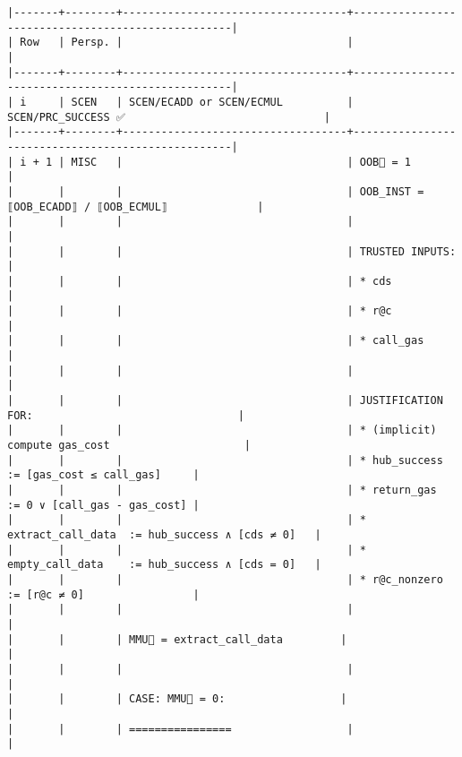 \documentclass[varwidth=\maxdimen,margin=0.5cm,multi={verbatim}]{standalone}
\begin{document}
\begin{verbatim}
|-------+--------+-----------------------------------+---------------------------------------------------|
| Row   | Persp. |                                   |                                                   |
|-------+--------+-----------------------------------+---------------------------------------------------|
| i     | SCEN   | SCEN/ECADD or SCEN/ECMUL          | SCEN/PRC_SUCCESS ✅                               |
|-------+--------+-----------------------------------+---------------------------------------------------|
| i + 1 | MISC   |                                   | OOB🏴 = 1                                         |
|       |        |                                   | OOB_INST = ⟦OOB_ECADD⟧ / ⟦OOB_ECMUL⟧              |
|       |        |                                   |                                                   |
|       |        |                                   | TRUSTED INPUTS:                                   |
|       |        |                                   | * cds                                             |
|       |        |                                   | * r@c                                             |
|       |        |                                   | * call_gas                                        |
|       |        |                                   |                                                   |
|       |        |                                   | JUSTIFICATION FOR:                                |
|       |        |                                   | * (implicit) compute gas_cost                     |
|       |        |                                   | * hub_success        := [gas_cost ≤ call_gas]     |
|       |        |                                   | * return_gas         := 0 ∨ [call_gas - gas_cost] |
|       |        |                                   | * extract_call_data  := hub_success ∧ [cds ≠ 0]   |
|       |        |                                   | * empty_call_data    := hub_success ∧ [cds = 0]   |
|       |        |                                   | * r@c_nonzero        := [r@c ≠ 0]                 |
|       |        |                                   |                                                   |
|       |        | MMU🏴 = extract_call_data         |                                                   |
|       |        |                                   |                                                   |
|       |        | CASE: MMU🏴 = 0:                  |                                                   |
|       |        | ================                  |                                                   |

\end{verbatim}
\end{document}
